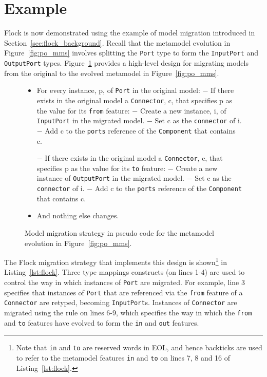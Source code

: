 \section{Example}
Flock is now demonstrated using the example of model migration introduced in Section~\ref{sec:flock_background}. Recall that the metamodel evolution in Figure~\ref{fig:po_mms} involves splitting the \texttt{Po\-rt} type to form the \texttt{In\-p\-utPo\-rt} and \texttt{Ou\-tp\-utPo\-rt} types. Figure~\ref{fig:po_migration_strategy} provides a high-level design for migrating models from the original to the evolved metamodel in Figure~\ref{fig:po_mms}.

\begin{figure}[h]
    \begin{framed}
        \footnotesize
        \begin{itemize}
            \item For every instance, p, of \texttt{Port} in the original model: 
            \subitem $-$ If there exists in the original model a \texttt{Connector}, c, that specifies p as the value for its \texttt{from} feature:
            \subsubitem $-$ Create a new instance, i, of \texttt{InputPort} in the migrated model.
            \subsubitem $-$ Set c as the \texttt{connector} of i.
            \subsubitem $-$ Add c to the \texttt{ports} reference of the \texttt{Component} that contains c.
            
            \subitem $-$ If there exists in the original model a \texttt{Connector}, c, that specifies p as the value for its \texttt{to} feature:
            \subsubitem $-$ Create a new instance of \texttt{OutputPort} in the migrated model.
            \subsubitem $-$ Set c as the \texttt{connector} of i.
            \subsubitem $-$ Add c to the \texttt{ports} reference of the \texttt{Component} that contains c.
            
            \item And nothing else changes.
        \end{itemize}
    \end{framed}
    \caption{Model migration strategy in pseudo code for the metamodel evolution in Figure~\ref{fig:po_mms}.}
    \label{fig:po_migration_strategy}
\end{figure}

The Flock migration strategy that implements this design is shown\footnote{Note that \texttt{in} and \texttt{to} are reserved words in EOL, and hence backticks are used to refer to the metamodel features \texttt{in} and \texttt{to} on lines 7, 8 and 16 of Listing~\ref{lst:flock}.} in Listing~\ref{lst:flock}. Three type mappings constructs (on lines 1-4) are used to control the way in which instances of \texttt{Po\-rt} are migrated. For example, line 3 specifies that instances of \texttt{Po\-rt} that are referenced via the \texttt{fr\-om} feature of a \texttt{Co\-nn\-ec\-t\-or} are retyped, becoming \texttt{In\-pu\-tPo\-rt}s. Instances of \texttt{Co\-nn\-ec\-t\-or} are migrated using the rule on lines 6-9, which specifies the way in which the \texttt{fr\-om} and \texttt{to} features have evolved to form the \texttt{in} and \texttt{out} features.

